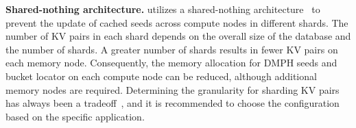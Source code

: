 \vspace{-1.5ex}
\noindent\textbf{Shared-nothing architecture.} \sys utilizes a shared-nothing architecture~\cite{tutorial} to prevent the update of cached seeds across compute nodes in different shards. The number of KV pairs in each shard depends on the overall size of the database and the number of shards. A greater number of shards results in fewer KV pairs on each memory node. Consequently, the memory allocation for DMPH seeds and bucket locator on each compute node can be reduced, although additional memory nodes are required. Determining the granularity for sharding KV pairs has always been a tradeoff~\cite{kraska}, and it is recommended to choose the configuration based on the specific application.


